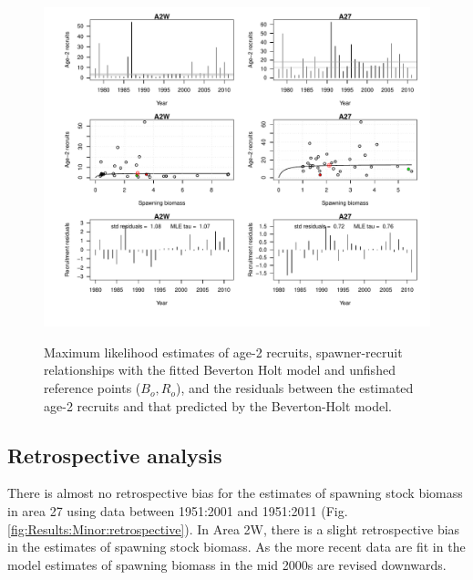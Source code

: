 \begin{figure}[!tbp]
	\includegraphics[width=\textwidth]{../FIGS/MinorAreas/iscam_fig_Recruitment.pdf}\\
	\caption{Maximum likelihood estimates of age-2 recruits, spawner-recruit relationships with the fitted Beverton Holt model and unfished reference points ($B_o, R_o$), and the residuals between the estimated age-2 recruits and that predicted by the Beverton-Holt model.}\label{Results:Minor:Recruitment}
\end{figure}

\subsection{Retrospective analysis}

There is almost no retrospective bias for the estimates of spawning stock biomass in area 27 using data between 1951:2001 and 1951:2011 (Fig. \ref{fig:Results:Minor:retrospective}).
In Area 2W, there is a slight retrospective bias in the estimates of spawning stock biomass.   As the more recent data are fit in the model estimates of spawning biomass in the mid 2000s are revised downwards.

